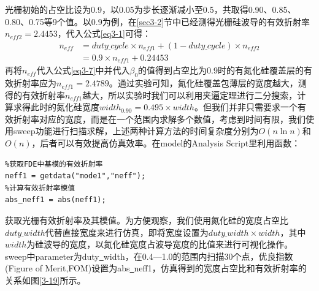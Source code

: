 \documentclass[UTF8,a4paper,12pt]{ctexart}
\numberwithin{equation}{section}
\begin{document}
光栅初始的占空比设为0.9，以0.05为步长逐渐减小至0.5，共取得0.90、0.85、0.80、0.75等9个值。以0.9为例，在\ref{sec3-2}节中已经测得光栅硅波导的有效折射率$n_{eff2}=2.4453$，代入公式\ref{eq3-1}可得：
\begin{align}
 n_{eff}&=duty\underline{~}cycle\times n_{eff1}+(1-duty\underline{~}cycle)\times n_{eff2}   \nonumber \\
&=0.9\times n_{eff1}+0.24453
\nonumber
\end{align}
再将$n_{eff}$代入公式\ref{eq3-7}中并代入$\beta_0$的值得到占空比为0.9时的有氮化硅覆盖层的有效折射率应为$n_{eff1}=2.4789$。通过实验可知，氮化硅覆盖包薄层的宽度越大，测得的有效折射率$n_{eff1}$越大，所以实验时我们可以利用夹逼定理进行二分搜索，计算求得此时的氮化硅宽度$width_{0.90}=0.495\times width$。但我们并非只需要求一个有效折射率对应的宽度，而是在一个范围内求解多个数值，考虑到时间有限，我们使用sweep功能进行扫描求解，上述两种计算方法的时间复杂度分别为$O(n\ln n)$和$O(n)$，后者可以有效提高仿真效率。在model的Analysis Script里利用函数：
\begin{lstlisting}
%获取FDE中基模的有效折射率
neff1 = getdata("mode1","neff");
%计算有效折射率模值
abs_neff1 = abs(neff1);
\end{lstlisting}
获取光栅有效折射率及其模值。为方便观察，我们使用氮化硅的宽度占空比$duty\underline{~}width$代替直接宽度来进行仿真，即将宽度设置为$duty\underline{~}width\times width$，其中$width$为硅波导的宽度，以氮化硅宽度占波导宽度的比值来进行可视化操作。sweep中parameter为duty\underline{~}width，在0.4—1.0的范围内扫描30个点，优良指数(Figure of Merit,FOM)设置为abs\underline{~}neff1，仿真得到的宽度占空比和有效折射率的关系如图\ref{3-19}所示。
\end{document}

